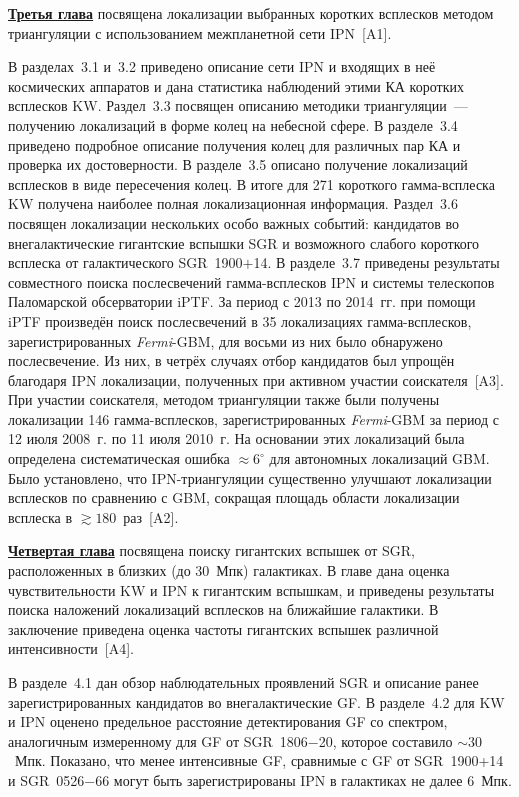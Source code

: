 \underline{\textbf{Третья глава}} посвящена локализации выбранных коротких всплесков 
методом триангуляции с использованием межпланетной сети IPN~[A1]. 

В разделах~3.1 и~3.2 приведено описание сети IPN и входящих в неё космических 
аппаратов и дана статистика наблюдений этими КА коротких всплесков KW. 
Раздел~3.3 посвящен описанию методики триангуляции~--- получению локализаций в 
форме колец на небесной сфере. В разделе~3.4 приведено подробное описание получения
колец для различных пар КА и проверка их достоверности. В разделе~3.5 описано
получение локализаций всплесков в виде пересечения колец. 
В итоге для 271 короткого гамма-всплеска KW получена наиболее полная локализационная информация. 
Раздел~3.6 посвящен 
локализации нескольких особо важных событий: кандидатов во внегалактические гигантские вспышки SGR 
и возможного слабого короткого всплеска от галактического SGR~1900$+$14.
В разделе~3.7 приведены результаты совместного поиска послесвечений гамма-всплесков IPN 
и системы телескопов Паломарской обсерватории iPTF. За период с 2013 по 2014~гг. 
при помощи iPTF произведён поиск послесвечений в 35 локализациях гамма-всплесков, 
зарегистрированных \textit{Fermi}-GBM, для восьми из них было обнаружено послесвечение. 
Из них, в четрёх случаях отбор кандидатов был упрощён благодаря IPN локализации, 
полученных при активном участии соискателя~[A3]. 
При участии соискателя, методом триангуляции также были получены локализации 146 гамма-всплесков,
зарегистрированных \textit{Fermi}-GBM за период с 12 июля 2008~г. по 11 июля 2010~г.
На основании этих локализаций была определена систематическая ошибка $\approx 6^\circ$
для автономных локализаций GBM. Было установлено, что IPN-триангуляции 
существенно улучшают локализации всплесков по сравнению с GBM, сокращая площадь 
области локализации всплеска в $\gtrsim 180$~раз~[A2].  

\underline{\textbf{Четвертая глава}} посвящена поиску гигантских вспышек от SGR, 
расположенных в близких (до 30~Мпк) галактиках.
В главе дана оценка чувствительности KW и IPN к гигантским вспышкам, 
и приведены результаты поиска наложений локализаций всплесков на ближайшие галактики. 
В заключение приведена оценка частоты гигантских вспышек различной 
интенсивности~[A4].

В разделе~4.1 дан обзор наблюдательных проявлений SGR и описание ранее зарегистрированных 
кандидатов во внегалактические GF. В разделе~4.2 для KW и IPN оценено предельное 
расстояние детектирования GF со спектром, аналогичным измеренному для GF от SGR~1806$-$20, 
которое составило $\sim 30$~Мпк. Показано, что менее интенсивные GF, сравнимые 
с GF от SGR~1900+14 и SGR~0526$-$66 могут быть зарегистрированы IPN в галактиках 
не далее $6$~Мпк.

